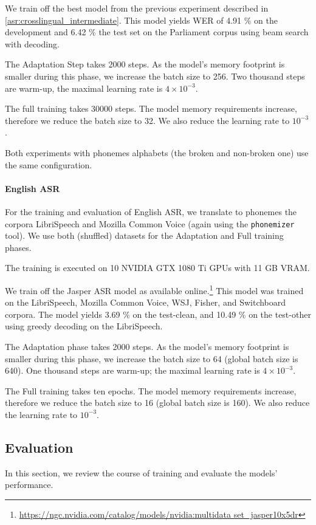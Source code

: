 We train off the best model from the previous experiment described in \cref{asr:crosslingual_intermediate}. This model yields WER of 4.91 \% on the development and 6.42 \% the test set on the Parliament corpus using beam search with decoding.

The Adaptation Step takes 2000 steps. As the model's memory footprint is smaller during this phase, we increase the batch size to 256. Two thousand steps are warm-up, the maximal learning rate is $4 \times 10^{-3}$.

The full training takes 30000 steps. The model memory requirements increase, therefore we reduce the batch size to 32. We also reduce the learning rate to $10^{-3}$.

Both experiments with phonemes alphabets (the broken and non-broken one) use the same configuration.

\paragraph{English ASR}
For the training and evaluation of English ASR, we translate to pho\-ne\-mes the corpora LibriSpeech and Mozilla Common Voice (again using the \texttt{pho\-ne\-mi\-zer} tool). We use both (shuffled) datasets for the Adaptation and Full training phases.

The training is executed on 10 NVIDIA GTX 1080 Ti GPUs with 11 GB VRAM.

We train off the Jasper ASR model as available online.\footnote{\url{https://ngc.nvidia.com/catalog/models/nvidia:multidata set\_jasper10x5dr}} This model was trained on the LibriSpeech, Mozilla Common Voice, WSJ, Fisher, and Switchboard corpora. The model yields 3.69 \% on the test-clean, and 10.49 \% on the test-other using greedy decoding on the LibriSpeech.

The Adaptation phase takes 2000 steps. As the model's memory footprint is smaller during this phase, we increase the batch size to 64 (global batch size is 640). One thousand steps are warm-up; the maximal learning rate is $4 \times 10^{-3}$.

The Full training takes ten epochs. The model memory requirements increase, therefore we reduce the batch size to 16 (global batch size is 160). We also reduce the learning rate to $10^{-3}$.

\subsection{Evaluation}
\label{asr:phon:eval}
In this section, we review the course of training and evaluate the models' performance.

